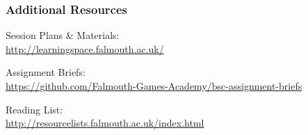 \documentclass[handout, xcolor={dvipsnames}]{beamer}\usepackage{etoolbox}\newtoggle{printable}\toggletrue{printable}
\begin{document}
\begin{frame}
	\frametitle{Additional Resources}
	
	Session Plans \& Materials: \\
	\url{http://learningspace.falmouth.ac.uk/}
	
	\vspace{1.5em}	
	
	Assignment Briefs: \\
	\url{https://github.com/Falmouth-Games-Academy/bsc-assignment-briefs}

	\vspace{1.5em}	
	
	Reading List: \\
	\url{http://resourcelists.falmouth.ac.uk/index.html}

\end{frame}
\end{document}
